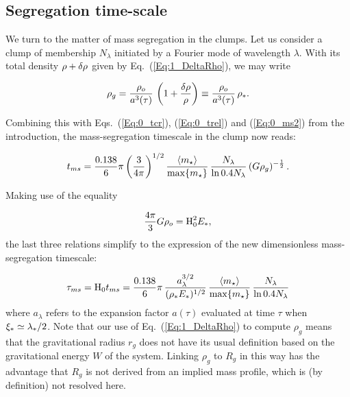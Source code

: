 \subsection{Segregation time-scale} 
\label{Sec:Timescales} 
We turn to the matter of mass segregation in the clumps. Let us consider a clump of membership $N_\lambda$ initiated by a Fourier mode of wavelength $\lambda$. With its total density $\rho + \delta\rho$ given by Eq.~(\ref{Eq:1_DeltaRho}), we may write 

\begin{equation}
 \rho_g = \frac{\rho_o}{a^3(\tau)} \, \left( 1 + \frac{\delta\rho}{\rho} \right) \equiv  \frac{\rho_o}{a^3(\tau)} \, \rho_\ast.
 \end{equation}
 
Combining this with Eqs.~(\ref{Eq:0_tcr}), (\ref{Eq:0_trel}) and (\ref{Eq:0_ms2}) from the introduction, the mass-segregation timescale in the clump now reads:

\begin{equation}
 t_{ms} = \frac{0.138}{6}\pi \left(\frac{3}{4\pi}\right)^{1/2} \frac{\langle m_\star\rangle}{\max\{m_\star\}} \, \frac{N_\lambda}{\ln 0.4 N_\lambda} \, (G\rho_g)^{-\frac{1}{2}}\, . \end{equation}
  
Making use of the equality 

\begin{equation}
\frac{4\pi}{3} G\rho_o = {\textrm{H}}_0^2 E_\ast ,
\end{equation} 
the last three relations simplify to the expression of the new dimensionless mass-segregation timescale:

\begin{equation}\label{Eqn:Taums} 
\tau_{ms} = {\textrm{H}}_0 t_{ms} = \frac{0.138}{6} \pi \, \frac{a_\lambda^{3/2}}{(\rho_\ast E_\ast)^{1/2}} \, \frac{\langle m_\star\rangle}{\max\{m_\star\}} \, \frac{N_\lambda}{\ln 0.4 N_\lambda} 
\end{equation}
where $a_\lambda$ refers to the expansion factor $a(\tau)$ evaluated at time $\tau$ when $\xi_\ast \simeq \lambda_\ast/2$. Note that our use of Eq.~(\ref{Eq:1_DeltaRho}) to compute $\rho_g$ means that the gravitational radius $r_g$ does not have its usual definition based on the gravitational energy $W$ of the system. Linking 
$\rho_g$ to $R_g$ in this way has the advantage that $R_g$ is not derived from an implied mass profile, which is (by definition) not resolved 
here. 

